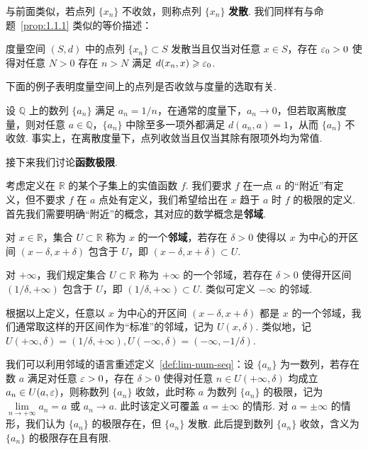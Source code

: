 \documentclass[../main.tex]{subfiles}
\begin{document}
与前面类似，若点列 $\{x_n\}$ 不收敛，则称点列 $\{x_n\}$ \textbf{发散}. 我们同样有与命题~\ref{prop:1.1.1} 类似的等价描述：

\begin{proposition}
    度量空间 $(S, d)$ 中的点列 $\{x_n\} \subset S$ 发散当且仅当对任意 $x \in S$，存在 $\varepsilon_0 > 0$ 使得对任意 $N > 0$ 存在 $n > N$ 满足 $d(x_n, x) \geqslant \varepsilon_0$. 
\end{proposition}

下面的例子表明度量空间上的点列是否收敛与度量的选取有关. 

\begin{example}
    设 $\mathbb Q$ 上的数列 $\{a_n\}$ 满足 $a_n = 1 / n$，在通常的度量下，$a_n \to 0$，但若取离散度量，则对任意 $a \in \mathbb Q$，$\{a_n\}$ 中除至多一项外都满足 $d(a_n, a) = 1$，从而 $\{a_n\}$ 不收敛. 事实上，在离散度量下，点列收敛当且仅当其除有限项外均为常值. 
\end{example}

接下来我们讨论\textbf{函数极限}. 

考虑定义在 $\mathbb R$ 的某个子集上的实值函数 $f$. 我们要求 $f$ 在一点 $a$ 的“附近”有定义，但不要求 $f$ 在 $a$ 点处有定义，我们希望给出在 $x$ 趋于 $a$ 时 $f$ 的极限的定义. 首先我们需要明确“附近”的概念，其对应的数学概念是\textbf{邻域}. 

\begin{definition} \label{def:nbh-R}
    对 $x \in \mathbb R$，集合 $U \subset \mathbb R$ 称为 $x$ 的一个\textbf{邻域}，若存在 $\delta > 0$ 使得以 $x$ 为中心的开区间 $(x - \delta, x + \delta)$ 包含于 $U$，即 $(x - \delta, x + \delta) \subset U$. 

    对 $+\infty$，我们规定集合 $U \subset \mathbb R$ 称为 $+\infty$ 的一个邻域，若存在 $\delta > 0$ 使得开区间 $(1/\delta, +\infty)$ 包含于 $U$，即 $(1/\delta, +\infty) \subset U$. 类似可定义 $-\infty$ 的邻域. 
\end{definition}

\begin{remark} \label{rem:1.1.3}
    根据以上定义，任意以 $x$ 为中心的开区间 $(x - \delta, x + \delta)$ 都是 $x$ 的一个邻域，我们通常取这样的开区间作为“标准”的邻域，记为 $U(x, \delta)$. 类似地，记 $U(+\infty, \delta) = (1/\delta, +\infty), U(-\infty, \delta) = (-\infty, -1/\delta)$. 

    我们可以利用邻域的语言重述定义~\ref{def:lim-num-seq}：设 $\{a_n\}$ 为一数列，若存在数 $a$ 满足对任意 $\varepsilon > 0$，存在 $\delta > 0$ 使得对任意 $n \in U(+\infty, \delta)$ 均成立 $a_n \in U(a, \varepsilon)$，则称数列 $\{a_n\}$ 收敛，此时称 $a$ 为数列 $\{a_n\}$ 的极限，记为 $\lim\limits_{n \to +\infty} a_n = a$ 或 $a_n \to a$. 此时该定义可覆盖 $a = \pm \infty$ 的情形. 对 $a = \pm \infty$ 的情形，我们认为 $\{a_n\}$ 的极限存在，但 $\{a_n\}$ 发散. 此后提到数列 $\{a_n\}$ 收敛，含义为 $\{a_n\}$ 的极限存在且有限. 
\end{remark}
\end{document}
